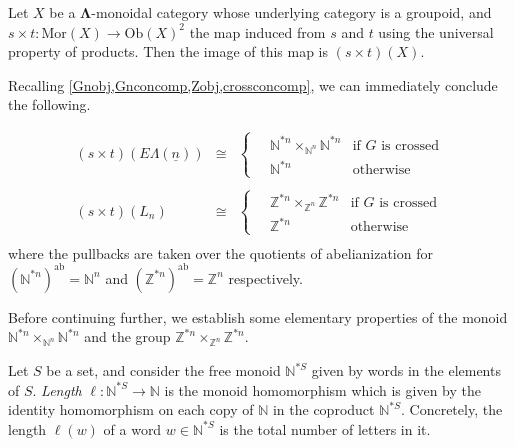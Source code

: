 \documentclass{amsbook} %
\newcommand{\N}{\mathbb{N}}
\newcommand{\ML}{\mathbf{\Lambda}}
\newcommand{\ELn}{E\Lambda(\underline{n})}
\newcommand{\ab}{\mathrm{ab}}
\numberwithin{section}{chapter}
\begin{document}
\begin{lem}\label{stmon} Let $X$ be a $\ML$-monoidal category whose underlying category is a groupoid, and $s \times t \colon  \mathrm{Mor}(X) \rightarrow \mathrm{Ob}(X)^2$ the map induced from $s$ and $t$ using the universal property of products. Then the image of this map is $(s \times t)(X)$.
\end{lem} 


Recalling \cref{Gnobj,Gnconcomp,Zobj,crossconcomp}, we can immediately conclude the following.

\begin{cor} \label{stpullback}
  \[
    \begin{array}{rll} 
  		(s \times t)(\ELn) & \cong & \begin{cases}
  								\quad \mathbb{N}^{\ast n} \times_{\mathbb{N}^n} \mathbb{N}^{\ast n} & \text{if $G$ is crossed}\\
  								\quad \mathbb{N}^{\ast n} & \text{otherwise}
  							\end{cases} \\
  		& & \\
  		(s \times t)(L_n) & \cong & \begin{cases}
  								\quad \mathbb{Z}^{\ast n} \times_{\mathbb{Z}^n} \mathbb{Z}^{\ast n}  & \text{if $G$ is crossed}\\
  								\quad \mathbb{Z}^{\ast n} & \text{otherwise}
  							\end{cases} \\
    \end{array}
  \]
where the pullbacks are taken over the quotients of abelianization for $(\mathbb{N}^{\ast n})^{\ab} = \mathbb{N}^n$ and $(\mathbb{Z}^{\ast n})^{\ab} = \mathbb{Z}^n$ respectively.
\end{cor}

Before continuing further, we establish some elementary properties of the monoid $\mathbb{N}^{\ast n} \times_{\mathbb{N}^n} \mathbb{N}^{\ast n}$ and the group $\mathbb{Z}^{\ast n} \times_{\mathbb{Z}^n} \mathbb{Z}^{\ast n}$.

\begin{Defi}\label{length}
Let $S$ be a set, and consider the free monoid $\N^{*S}$ given by words in the elements of $S$. \emph{Length} $\ell \colon \N^{*S} \rightarrow \N$ is the monoid homomorphism which is given by the identity homomorphism on each copy of $\N$ in the coproduct $\N^{*S}$. Concretely, the length $\ell(w)$ of a word $w \in \N^{*S}$ is the total number of letters in it.
\end{Defi}
\end{document}
